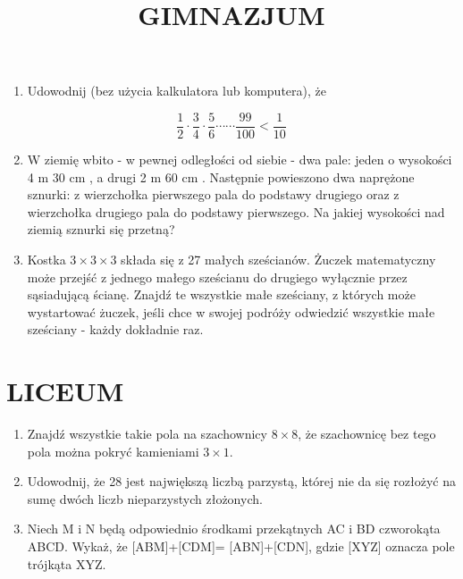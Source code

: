 \documentclass[10pt]{article}
\title{GIMNAZJUM }
\author{}
\date{}
\begin{document}
\maketitle
\begin{enumerate}
  \item Udowodnij (bez użycia kalkulatora lub komputera), że
\end{enumerate}

\[
\frac{1}{2} \cdot \frac{3}{4} \cdot \frac{5}{6} \cdots \cdots \frac{99}{100}<\frac{1}{10}
\]

\begin{enumerate}
  \setcounter{enumi}{1}
  \item W ziemię wbito - w pewnej odległości od siebie - dwa pale: jeden o wysokości 4 m 30 cm , a drugi 2 m 60 cm . Następnie powieszono dwa naprężone sznurki: z wierzchołka pierwszego pala do podstawy drugiego oraz z wierzchołka drugiego pala do podstawy pierwszego. Na jakiej wysokości nad ziemią sznurki się przetną?
  \item Kostka \(3 \times 3 \times 3\) składa się z 27 małych sześcianów. Żuczek matematyczny może przejść z jednego małego sześcianu do drugiego wyłącznie przez sąsiadującą ścianę. Znajdź te wszystkie małe sześciany, z których może wystartować żuczek, jeśli chce w swojej podróży odwiedzić wszystkie małe sześciany - każdy dokładnie raz.
\end{enumerate}

\section*{LICEUM}
\begin{enumerate}
  \item Znajdź wszystkie takie pola na szachownicy \(8 \times 8\), że szachownicę bez tego pola można pokryć kamieniami \(3 \times 1\).
  \item Udowodnij, że 28 jest największą liczbą parzystą, której nie da się rozłożyć na sumę dwóch liczb nieparzystych złożonych.
  \item Niech M i N będą odpowiednio środkami przekątnych AC i BD czworokąta ABCD. Wykaż, że [ABM]+[CDM]= [ABN]+[CDN], gdzie [XYZ] oznacza pole trójkąta XYZ.
\end{enumerate}
\end{document}
